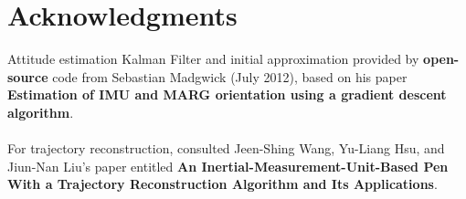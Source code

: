 \documentclass{article}
\begin{document}
\section*{Acknowledgments} 
 
Attitude estimation Kalman Filter and initial approximation provided by \textbf{open-source} code from Sebastian Madgwick (July 2012), based on his paper \textbf{Estimation of IMU and MARG orientation using a gradient descent algorithm}.\\\\
For trajectory reconstruction, consulted Jeen-Shing Wang, Yu-Liang Hsu, and Jiun-Nan Liu's paper entitled \textbf{An Inertial-Measurement-Unit-Based Pen With a Trajectory Reconstruction Algorithm and Its Applications}.
%
%
\end{document}
